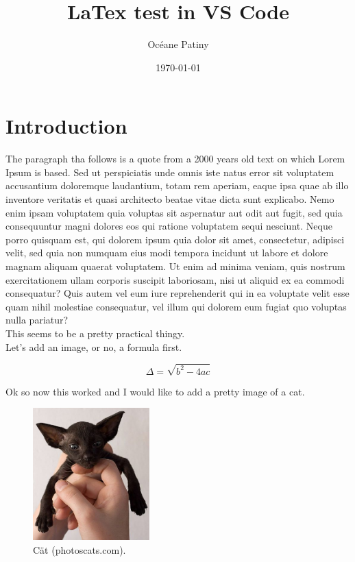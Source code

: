 \documentclass[a4paper,10pt]{article}
\title{LaTex test in VS Code}
\author{Océane Patiny}
\date{\today}
\begin{document}
\maketitle

\section*{Introduction}

The paragraph tha follows is a quote from a 2000 years old text on which Lorem Ipsum is based.
Sed ut perspiciatis unde omnis iste natus error sit voluptatem accusantium doloremque laudantium, totam rem aperiam, eaque ipsa quae ab illo inventore veritatis et quasi architecto beatae vitae dicta sunt explicabo. Nemo enim ipsam voluptatem quia voluptas sit aspernatur aut odit aut fugit, sed quia consequuntur magni dolores eos qui ratione voluptatem sequi nesciunt. Neque porro quisquam est, qui dolorem ipsum quia dolor sit amet, consectetur, adipisci velit, sed quia non numquam eius modi tempora incidunt ut labore et dolore magnam aliquam quaerat voluptatem. Ut enim ad minima veniam, quis nostrum exercitationem ullam corporis suscipit laboriosam, nisi ut aliquid ex ea commodi consequatur? Quis autem vel eum iure reprehenderit qui in ea voluptate velit esse quam nihil molestiae consequatur, vel illum qui dolorem eum fugiat quo voluptas nulla pariatur?\\

This seems to be a pretty practical thingy.\\

Let's add an image, or no, a formula first.

\begin{equation}
    \Delta = \sqrt{b^2 - 4ac}
\end{equation}

Ok so now this worked and I would like to add a pretty image of a cat.


\begin{figure}[H]
    \centering
    \includegraphics[width = 0.4\textwidth]{images/sphinx.jpg}
    \caption{Cät (photoscats.com).}
    \label{fig:scheme1}
\end{figure}



\label{Lastpage}
\end{document}
